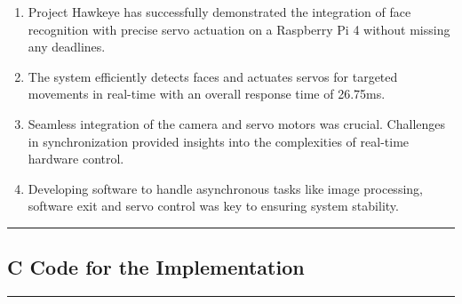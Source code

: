 \documentclass[a4paper,11pt]{article}%
\begin{document}
\begin{enumerate}
    \item Project Hawkeye has successfully demonstrated the integration of face recognition with precise servo actuation on a Raspberry Pi 4 without missing any deadlines.
    \item The system efficiently detects faces and actuates servos for targeted movements in real-time with an overall response time of 26.75ms.
    \item Seamless integration of the camera and servo motors was crucial. Challenges in synchronization provided insights into the complexities of real-time hardware control.
    \item Developing software to handle asynchronous tasks like image processing, software exit and servo control was key to ensuring system stability.
\end{enumerate}


\vfill
\hrule
\vspace{0.5cm}
\pagebreak
\begin{appendices}
    \section{C Code for the Implementation}
    
    \pagebreak
\end{appendices}


\vspace{1cm}
\hrule
\vspace{0.5cm}


\end{document}
